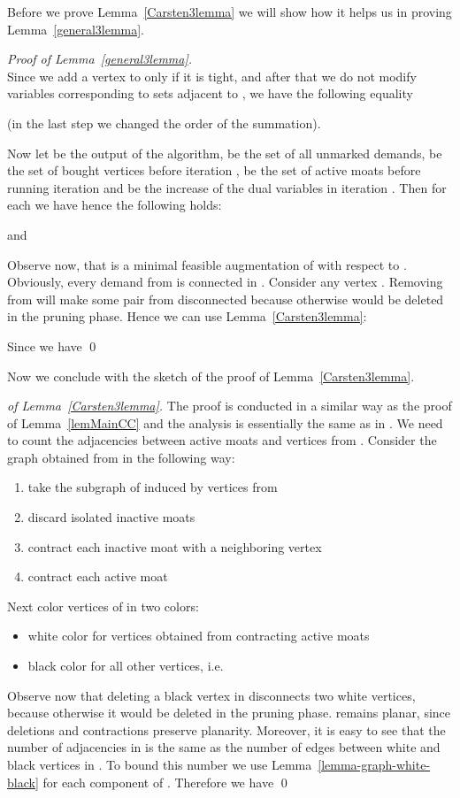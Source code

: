 Before we prove Lemma~\ref{Carsten3lemma} we will show how it helps us in proving Lemma~\ref{general3lemma}.\\
\begin{proof}[Proof of Lemma~\ref{general3lemma}]\\
Since we add a vertex  to  only if it is tight, and after that we do not modify variables corresponding to sets adjacent to , we have the following equality

(in the last step we changed the order of the summation).

Now let  be the output of the algorithm,  be the set of all unmarked demands,  be the set of bought vertices before iteration ,  be the set of active moats before running iteration  and  be the increase of the dual variables in iteration . Then for each  we have  hence the following holds:

and


Observe now, that  is a minimal feasible augmentation of  with respect to . Obviously, every demand from  is connected in . Consider any vertex . Removing  from  will make some pair from  disconnected because otherwise  would be deleted in the pruning phase. Hence we can use Lemma~\ref{Carsten3lemma}:

Since  we have
 \qed
\end{proof}

Now we conclude with the sketch of the proof of Lemma~\ref{Carsten3lemma}.
\begin{proof}[of Lemma~\ref{Carsten3lemma}]
The proof is conducted in a similar way as the proof of Lemma~\ref{lemMainCC} and the analysis is essentially the same as in \cite{Moldenhauer}.
We need to count the adjacencies between active moats and vertices from . Consider the graph  obtained from  in the following way:
\begin{enumerate}
	\item take the subgraph of  induced by vertices from 
	\item discard isolated inactive moats
	\item contract each inactive moat with a neighboring vertex 
	\item contract each active moat
\end{enumerate}
Next color vertices of  in two colors:
\begin{itemize}
	\item white color for vertices obtained from contracting active moats
	\item black color for all other vertices, i.e. 
\end{itemize}
Observe now that deleting a black vertex in  disconnects two white vertices, because otherwise it would be deleted in the pruning phase.  remains planar, since deletions and contractions preserve planarity. Moreover, it is easy to see that the number of adjacencies  in  is the same as the number of edges between white and black vertices in . To bound this number we use Lemma~\ref{lemma-graph-white-black} for each component of . Therefore we have  \qed
\end{proof}
